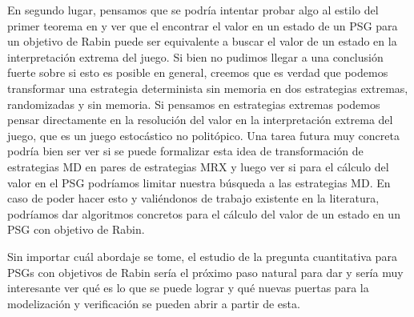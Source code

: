 En segundo lugar, pensamos que se podría intentar probar algo al estilo del
primer teorema en \cite{Polytopal} y ver que el encontrar el valor en un estado
de un PSG para un objetivo de Rabin puede ser equivalente a buscar el valor de
un estado en la interpretación extrema del juego. Si bien no pudimos llegar a
una conclusión fuerte sobre si esto es posible en general, creemos que es
verdad que podemos transformar una estrategia determinista sin memoria en dos
estrategias extremas, randomizadas y sin memoria. Si pensamos en estrategias
extremas podemos pensar directamente en la resolución del valor en la
interpretación extrema del juego, que es un juego estocástico no politópico.
Una tarea futura muy concreta podría bien ser ver si se puede formalizar esta
idea de transformación de estrategias MD en pares de estrategias MRX y luego
ver si para el cálculo del valor en el PSG podríamos limitar nuestra búsqueda a
las estrategias MD. En caso de poder hacer esto y valiéndonos de trabajo
existente en la literatura, podríamos dar algoritmos concretos para el cálculo
del valor de un estado en un PSG con objetivo de Rabin.

Sin importar cuál abordaje se tome, el estudio de la pregunta cuantitativa para
PSGs con objetivos de Rabin sería el próximo paso natural para dar y sería muy
interesante ver qué es lo que se puede lograr y qué nuevas puertas para la
modelización y verificación se pueden abrir a partir de esta.